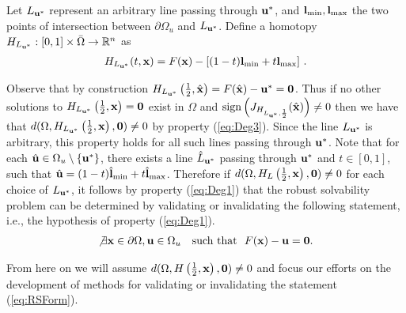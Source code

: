 Let $L_{\mathbf{u}^*}$ represent an arbitrary line passing through $\mathbf{u}^*$, and $\mathbf{l}_{\min},\mathbf{l}_{\max}$ the two points of intersection between $\partial\Omega_u$ and $L_{\mathbf{u}^*}$. 
Define a homotopy $H_{L_{\mathbf{u}^*}} : [0,1]\times\bar{\Omega}\rightarrow\mathbb{R}^n$ as 
\begin{align}
H_{L_{\mathbf{u}^*}}(t,\mathbf{x}) = F(\mathbf{x})-\left[(1-t)\mathbf{l}_{\min}+t\mathbf{l}_{\max}\right]\,. \label{eq:Homo}
\end{align}

Observe that by construction $H_{L_{\mathbf{u}^*}}\left(\frac{1}{2},\hat{\mathbf{x}}\right)=F(\hat{\mathbf{x}})-\mathbf{u}^*=\mathbf{0}$. 
Thus if no other solutions to $H_{L_{\mathbf{u}^*}}\left(\frac{1}{2},\mathbf{x}\right)=\mathbf{0}$ exist in $\Omega$ and $ \operatorname{sign}\left(J_{H_{L_{\mathbf{u}^*},\frac{1}{2}}}(\hat{\mathbf{x}})\right) \neq 0$ then we have that $ d(\Omega,H_{L_{\mathbf{u}^*}}\left(\frac{1}{2},\mathbf{x}\right),\mathbf{0})\neq 0$ by property (\ref{eq:Deg3}). 
Since the line $L_{\mathbf{u}^*}$ is arbitrary, this property holds for all such lines passing through $\mathbf{u}^*$.
Note that for each $\hat{\mathbf{u}}\in\Omega_u\setminus\{\mathbf{u}^*\}$, there exists a line $\hat{L}_{\mathbf{u}^*}$ passing through $\mathbf{u}^*$ and $t\in[0,1]$,  such that $\hat{\mathbf{u}}=(1-t)\hat{\mathbf{l}}_{\min}+t\hat{\mathbf{l}}_{\max}$. 
Therefore if $d(\Omega,H_L\left(\frac{1}{2},\mathbf{x}\right),\mathbf{0})\neq 0$ for each choice of $L_{\mathbf{u}^*}$, it follows by property (\ref{eq:Deg1}) that the robust solvability problem can be determined by validating or invalidating the following statement, i.e., the hypothesis of property (\ref{eq:Deg1}).
\begin{align}
\not\exists \mathbf{x}\in\partial\Omega, \mathbf{u}\in\Omega_u \ \ \mbox{ such that } \ F(\mathbf{x})-\mathbf{u}=\mathbf{0}. \label{eq:RSForm}
\end{align}

From here on we will assume $d(\Omega,H\left(\frac{1}{2},\mathbf{x}\right),\mathbf{0})\neq 0$ and focus our efforts on the development of methods for validating or invalidating the statement (\ref{eq:RSForm}).

